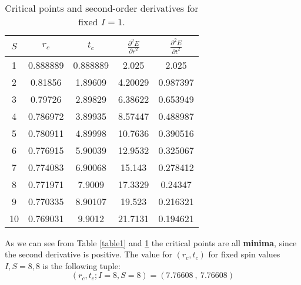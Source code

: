 \documentclass[a4paper]{article}
\begin{document}
\begin{table}[h]
    \centering
    \begin{tabular}{ccccc}
        \toprule
        $S$ & $r_c$ & $t_c$ & $\frac{\partial^2 E}{\partial r^2}$ & $\frac{\partial^2 E}{\partial t^2}$ \\
        \midrule
        1  & 0.888889 & 0.888889 & 2.025 & 2.025 \\
        2  & 0.81856  & 1.89609  & 4.20029 & 0.987397 \\
        3  & 0.79726  & 2.89829  & 6.38622 & 0.653949 \\
        4  & 0.786972 & 3.89935  & 8.57447 & 0.488987 \\
        5  & 0.780911 & 4.89998  & 10.7636 & 0.390516 \\
        6  & 0.776915 & 5.90039  & 12.9532 & 0.325067 \\
        7  & 0.774083 & 6.90068  & 15.143  & 0.278412 \\
        8  & 0.771971 & 7.9009   & 17.3329 & 0.24347 \\
        9  & 0.770335 & 8.90107  & 19.523  & 0.216321 \\
        10 & 0.769031 & 9.9012   & 21.7131 & 0.194621 \\
        \bottomrule
    \end{tabular}
    \caption{Critical points and second-order derivatives for fixed $I=1$.}
    \label{table2}
\end{table}

As we can see from Table \ref{table1} and \ref{table2} the critical points are all \textbf{minima}, since the second derivative is positive. The value for $(r_c, t_c)$ for fixed spin values $I,S=8, 8$ is the following tuple:
$$(r_c, t_c;I=8,S=8)=(7.76608\ ,\ 7.76608)$$
\end{document}
